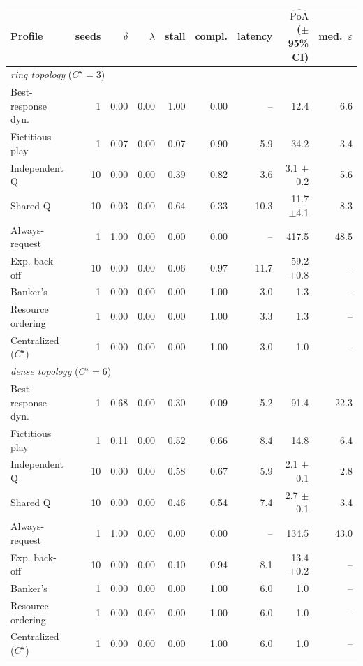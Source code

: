 \begin{tabular}{lrrrrrrrr}
\toprule
Profile & seeds & $\delta$ & $\lambda$ & stall & compl. & latency & $\widehat{\mathrm{PoA}}$ ($\pm$95\% CI) & med.\ $\varepsilon$ \\
\midrule
\multicolumn{9}{l}{\emph{ring topology} ($C^\star=3$)} \\
Best-response dyn. & 1 & 0.00 & 0.00 & 1.00 & 0.00 & -- & 12.4 & 6.6 \\
Fictitious play & 1 & 0.07 & 0.00 & 0.07 & 0.90 & 5.9 & 34.2 & 3.4 \\
Independent Q & 10 & 0.00 & 0.00 & 0.39 & 0.82 & 3.6 & 3.1 $\pm$0.2 & 5.6 \\
Shared Q & 10 & 0.03 & 0.00 & 0.64 & 0.33 & 10.3 & 11.7 $\pm$4.1 & 8.3 \\
Always-request & 1 & 1.00 & 0.00 & 0.00 & 0.00 & -- & 417.5 & 48.5 \\
Exp. back-off & 10 & 0.00 & 0.00 & 0.06 & 0.97 & 11.7 & 59.2 $\pm$0.8 & -- \\
Banker's & 1 & 0.00 & 0.00 & 0.00 & 1.00 & 3.0 & 1.3 & -- \\
Resource ordering & 1 & 0.00 & 0.00 & 0.00 & 1.00 & 3.3 & 1.3 & -- \\
Centralized ($C^\star$) & 1 & 0.00 & 0.00 & 0.00 & 1.00 & 3.0 & 1.0 & -- \\
\midrule
\multicolumn{9}{l}{\emph{dense topology} ($C^\star=6$)} \\
Best-response dyn. & 1 & 0.68 & 0.00 & 0.30 & 0.09 & 5.2 & 91.4 & 22.3 \\
Fictitious play & 1 & 0.11 & 0.00 & 0.52 & 0.66 & 8.4 & 14.8 & 6.4 \\
Independent Q & 10 & 0.00 & 0.00 & 0.58 & 0.67 & 5.9 & 2.1 $\pm$0.1 & 2.8 \\
Shared Q & 10 & 0.00 & 0.00 & 0.46 & 0.54 & 7.4 & 2.7 $\pm$0.1 & 3.4 \\
Always-request & 1 & 1.00 & 0.00 & 0.00 & 0.00 & -- & 134.5 & 43.0 \\
Exp. back-off & 10 & 0.00 & 0.00 & 0.10 & 0.94 & 8.1 & 13.4 $\pm$0.2 & -- \\
Banker's & 1 & 0.00 & 0.00 & 0.00 & 1.00 & 6.0 & 1.0 & -- \\
Resource ordering & 1 & 0.00 & 0.00 & 0.00 & 1.00 & 6.0 & 1.0 & -- \\
Centralized ($C^\star$) & 1 & 0.00 & 0.00 & 0.00 & 1.00 & 6.0 & 1.0 & -- \\
\bottomrule
\end{tabular}
